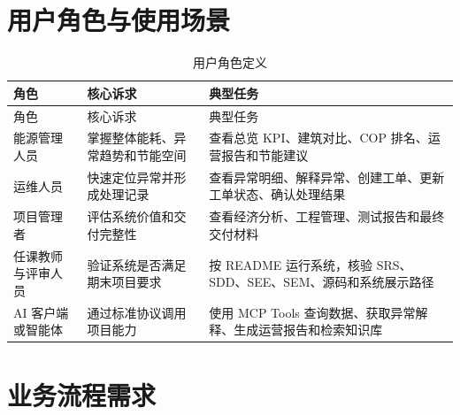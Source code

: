 \documentclass[12pt,a4paper]{ctexart}
\begin{document}
\section{用户角色与使用场景}
\begin{longtable}{p{3.2cm}p{4.4cm}p{6.8cm}}
\caption{用户角色定义}\\
\toprule
角色 & 核心诉求 & 典型任务 \\
\midrule
\endfirsthead
\toprule
角色 & 核心诉求 & 典型任务 \\
\midrule
\endhead
能源管理人员 & 掌握整体能耗、异常趋势和节能空间 & 查看总览 KPI、建筑对比、COP 排名、运营报告和节能建议 \\
运维人员 & 快速定位异常并形成处理记录 & 查看异常明细、解释异常、创建工单、更新工单状态、确认处理结果 \\
项目管理者 & 评估系统价值和交付完整性 & 查看经济分析、工程管理、测试报告和最终交付材料 \\
任课教师与评审人员 & 验证系统是否满足期末项目要求 & 按 README 运行系统，核验 SRS、SDD、SEE、SEM、源码和系统展示路径 \\
AI 客户端或智能体 & 通过标准协议调用项目能力 & 使用 MCP Tools 查询数据、获取异常解释、生成运营报告和检索知识库 \\
\bottomrule
\end{longtable}

\section{业务流程需求}
\end{document}
